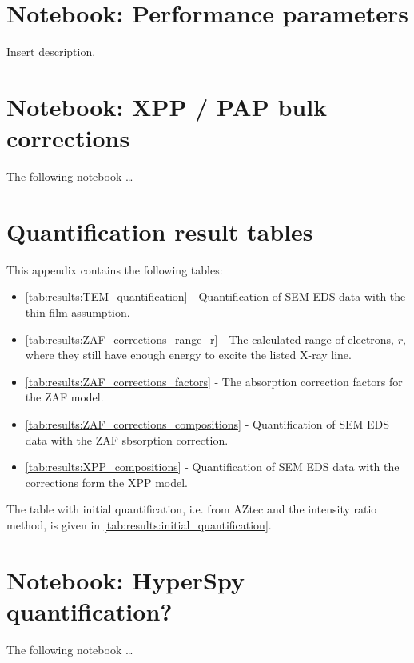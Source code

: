 



\chapter{Notebook: Performance parameters}
\label{appendix:performance}

Insert description.


\chapter{Notebook: XPP / PAP bulk corrections}
\label{appendix:xpp}

The following notebook \dots
% 



\chapter{Quantification result tables}
\label{appendix:tables}

This appendix contains the following tables:

\begin{itemize}
    \item \cref{tab:results:TEM_quantification} - Quantification of SEM EDS data with the thin film assumption.
    \item \cref{tab:results:ZAF_corrections_range_r} - The calculated range of electrons, $r$, where they still have enough energy to excite the listed X-ray line.
    \item \cref{tab:results:ZAF_corrections_factors} - The absorption correction factors for the ZAF model.
    \item \cref{tab:results:ZAF_corrections_compositions} - Quantification of SEM EDS data with the ZAF sbsorption correction.
    \item \cref{tab:results:XPP_compositions} - Quantification of SEM EDS data with the corrections form the XPP model.    
\end{itemize}

The table with initial quantification, i.e. from AZtec and the intensity ratio method, is given in \cref{tab:results:initial_quantification}.









\chapter{Notebook: HyperSpy quantification?}
\label{appendix:HSquant}

The following notebook \dots
% 
